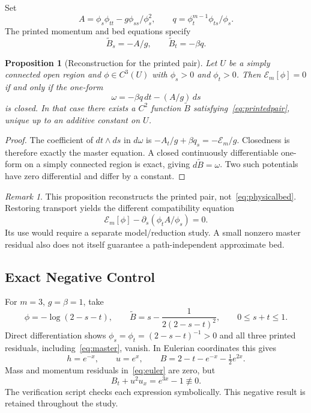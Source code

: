 \documentclass[11pt,a4paper]{article}
\newtheorem{proposition}[theorem]{Proposition}
\theoremstyle{definition}
\theoremstyle{remark}
\newtheorem{remark}[theorem]{Remark}
\newcommand{\E}{\mathcal E}
\begin{document}
Set
\begin{equation}
A=\phi_s\phi_{tt}-g\phi_{ss}/\phi_s^2,\qquad
q=\phi_t^{m-1}\phi_{ts}/\phi_s.
\label{eq:Aq}
\end{equation}
The printed momentum and bed equations specify
\begin{equation}
\widetilde B_s=-A/g,\qquad \widetilde B_t=-\beta q.
\label{eq:printedpair}
\end{equation}

\begin{proposition}[Reconstruction for the printed pair]\label{prop:bed}
Let $U$ be a simply connected open region and $\phi\in C^3(U)$ with $\phi_s>0$ and $\phi_t>0$. Then $\E_m[\phi]=0$ if and only if the one-form
\[
\omega=-\beta q\,dt-(A/g)\,ds
\]
is closed. In that case there exists a $C^2$ function $\widetilde B$ satisfying~\eqref{eq:printedpair}, unique up to an additive constant on $U$.
\end{proposition}
\begin{proof}
The coefficient of $dt\wedge ds$ in $d\omega$ is
$-A_t/g+\beta q_s=-\E_m/g$. Closedness is therefore exactly the master equation. A closed continuously differentiable one-form on a simply connected region is exact, giving $d\widetilde B=\omega$. Two such potentials have zero differential and differ by a constant.
\end{proof}

\begin{remark}
This proposition reconstructs the printed pair, not~\eqref{eq:physicalbed}. Restoring transport yields the different compatibility equation
\[
\E_m[\phi]-\partial_s(\phi_tA/\phi_s)=0.
\]
Its use would require a separate model/reduction study. A small nonzero master residual also does not itself guarantee a path-independent approximate bed.
\end{remark}

\subsection{Exact Negative Control}\label{sec:negative}
For $m=3$, $g=\beta=1$, take
\begin{equation}
\phi=-\log(2-s-t),\qquad
\widetilde B=s-\frac{1}{2(2-s-t)^2},\qquad 0\le s+t\le1.
\label{eq:wave}
\end{equation}
Direct differentiation shows $\phi_s=\phi_t=(2-s-t)^{-1}>0$ and all three printed residuals, including~\eqref{eq:master}, vanish. In Eulerian coordinates this gives
\begin{equation}
h=e^{-x},\qquad u=e^x,\qquad
B=2-t-e^{-x}-\tfrac12e^{2x}.
\end{equation}
Mass and momentum residuals in~\eqref{eq:euler} are zero, but
\begin{equation}
B_t+u^2u_x=e^{3x}-1\not\equiv0.
\label{eq:counterexample}
\end{equation}
The verification script checks each expression symbolically. This negative result is retained throughout the study.
\end{document}
